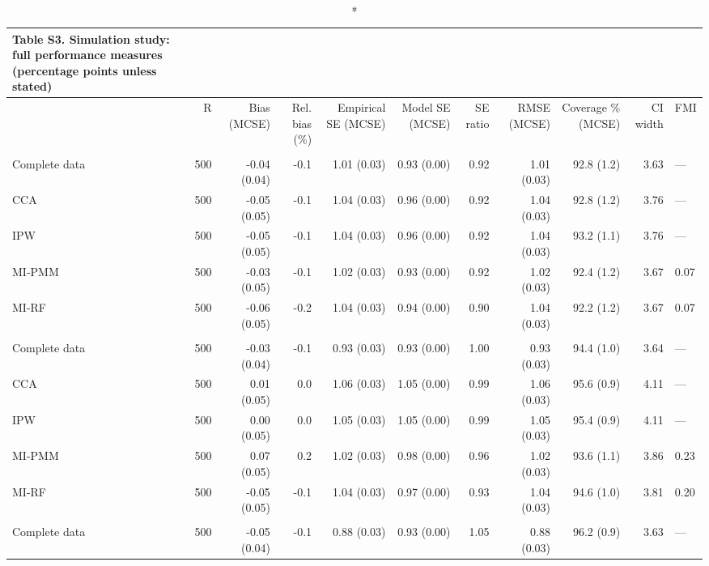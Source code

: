 \documentclass[11pt,a4paper]{article}
\begin{document}
\begin{landscape}
\begingroup
\fontsize{8.0pt}{10.0pt}\selectfont
\begin{longtable}{l|rrrrrrrrrl}
\caption*{
{\fontsize{20}{25}\selectfont  Table S3. Simulation study: full performance measures (percentage points unless stated)\fontsize{8}{10}\selectfont }
} \\ 
\toprule
 & R & Bias (MCSE) & Rel. bias (\%) & Empirical SE (MCSE) & Model SE (MCSE) & SE ratio & RMSE (MCSE) & Coverage \% (MCSE) & CI width & FMI \\ 
\midrule\endhead\addlinespace[2.5pt]
\multicolumn{11}{l}{Stunting — MCAR 10\%} \\[2.5pt] 
\midrule\addlinespace[2.5pt]
Complete data & 500 & -0.04 (0.04) & -0.1 & 1.01 (0.03) & 0.93 (0.00) & 0.92 & 1.01 (0.03) & 92.8 (1.2) & 3.63 & — \\ 
CCA & 500 & -0.05 (0.05) & -0.1 & 1.04 (0.03) & 0.96 (0.00) & 0.92 & 1.04 (0.03) & 92.8 (1.2) & 3.76 & — \\ 
IPW & 500 & -0.05 (0.05) & -0.1 & 1.04 (0.03) & 0.96 (0.00) & 0.92 & 1.04 (0.03) & 93.2 (1.1) & 3.76 & — \\ 
MI-PMM & 500 & -0.03 (0.05) & -0.1 & 1.02 (0.03) & 0.93 (0.00) & 0.92 & 1.02 (0.03) & 92.4 (1.2) & 3.67 & 0.07 \\ 
MI-RF & 500 & -0.06 (0.05) & -0.2 & 1.04 (0.03) & 0.94 (0.00) & 0.90 & 1.04 (0.03) & 92.2 (1.2) & 3.67 & 0.07 \\ 
\midrule\addlinespace[2.5pt]
\multicolumn{11}{l}{Stunting — MCAR 30\%} \\[2.5pt] 
\midrule\addlinespace[2.5pt]
Complete data & 500 & -0.03 (0.04) & -0.1 & 0.93 (0.03) & 0.93 (0.00) & 1.00 & 0.93 (0.03) & 94.4 (1.0) & 3.64 & — \\ 
CCA & 500 & 0.01 (0.05) & 0.0 & 1.06 (0.03) & 1.05 (0.00) & 0.99 & 1.06 (0.03) & 95.6 (0.9) & 4.11 & — \\ 
IPW & 500 & 0.00 (0.05) & 0.0 & 1.05 (0.03) & 1.05 (0.00) & 0.99 & 1.05 (0.03) & 95.4 (0.9) & 4.11 & — \\ 
MI-PMM & 500 & 0.07 (0.05) & 0.2 & 1.02 (0.03) & 0.98 (0.00) & 0.96 & 1.02 (0.03) & 93.6 (1.1) & 3.86 & 0.23 \\ 
MI-RF & 500 & -0.05 (0.05) & -0.1 & 1.04 (0.03) & 0.97 (0.00) & 0.93 & 1.04 (0.03) & 94.6 (1.0) & 3.81 & 0.20 \\ 
\midrule\addlinespace[2.5pt]
\multicolumn{11}{l}{Stunting — MCAR 50\%} \\[2.5pt] 
\midrule\addlinespace[2.5pt]
Complete data & 500 & -0.05 (0.04) & -0.1 & 0.88 (0.03) & 0.93 (0.00) & 1.05 & 0.88 (0.03) & 96.2 (0.9) & 3.63 & — \\ 

\end{longtable}
\end{landscape}
\end{document}
